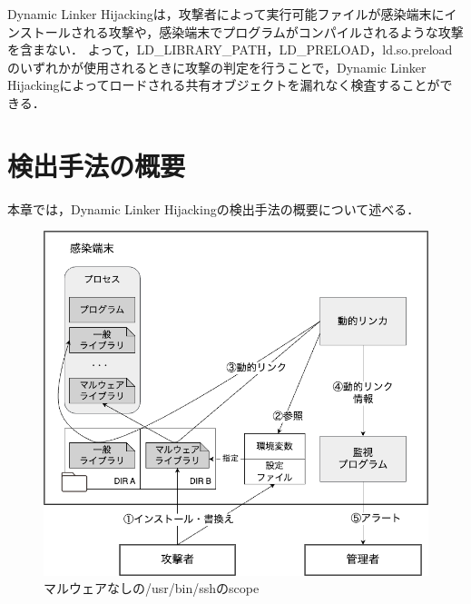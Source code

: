 \documentclass[submit,techreq,noauthor]{eco}	%
\begin{document}
 Dynamic Linker Hijackingは，攻撃者によって実行可能ファイルが感染端末にインストールされる攻撃や，感染端末でプログラムがコンパイルされるような攻撃を含まない．
 よって，LD\_LIBRARY\_PATH，LD\_PRELOAD，ld.so.preloadのいずれかが使用されるときに攻撃の判定を行うことで，Dynamic Linker Hijackingによってロードされる共有オブジェクトを漏れなく検査することができる．\\



\section{検出手法の概要}
本章では，Dynamic Linker Hijackingの検出手法の概要について述べる．

\begin{figure}[t]
	\centering
  \includegraphics[width=13cm]{fig/method3.png}
	\caption{マルウェアなしの/usr/bin/sshのscope}
	\label{fig:method}
\end{figure}
\end{document}
